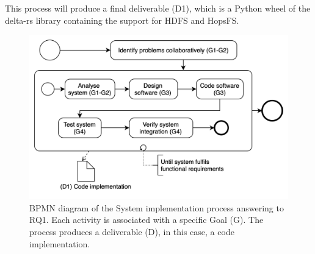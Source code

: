 This process will produce a final deliverable (D1), which is a Python wheel of the delta-rs library containing the support for \gls{HDFS} and \gls{HopsFS}.

\begin{figure}[!ht]
    \begin{center}
      \includegraphics[width=\textwidth]{figures/3-method/research_process_rq1.png}
    \caption{\gls{BPMN} diagram of the System implementation process answering to RQ1. Each activity is associated with a specific Goal (\gls{G}). The process produces a deliverable (\gls{D}), in this case, a code implementation.}
    \label{fig:DevProcessRQ1}
    \end{center}
\end{figure}

